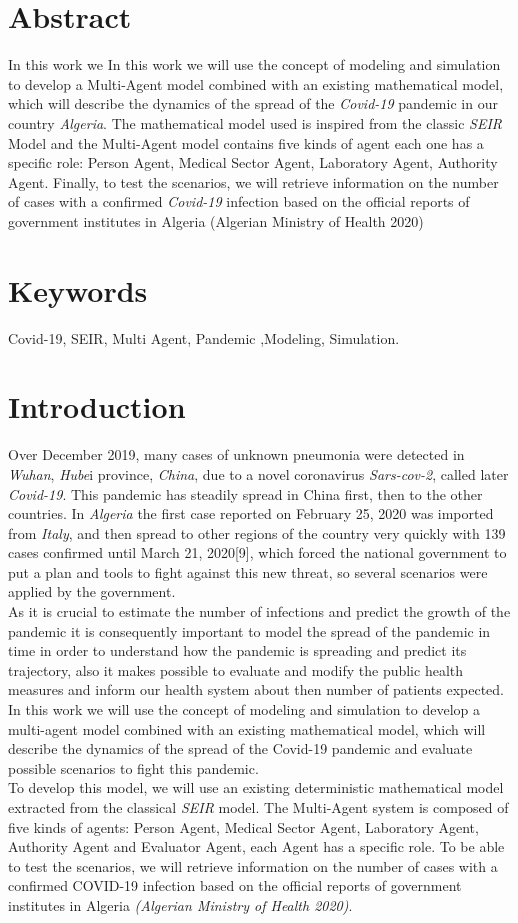 \documentclass[paper=a4, fontsize=11.5pt]{scrartcl}
\numberwithin{equation}{section}		%
\numberwithin{figure}{section}			%
\numberwithin{table}{section}				%
\begin{document}
\section{ Abstract}
\quad In this work we In this work we will use the concept of modeling and simulation to develop a Multi-Agent model combined with an existing mathematical model, which will describe the dynamics of the spread of the \emph{Covid-19} pandemic in our country \emph{Algeria}. The mathematical model used is inspired from the classic \emph{SEIR} Model and the Multi-Agent model contains five kinds of agent each one has a specific role: Person Agent, Medical Sector Agent, Laboratory Agent, Authority Agent. Finally, to test the scenarios, we will retrieve information on the number of cases with a confirmed \emph{Covid-19} infection based on the official reports of government institutes in Algeria (Algerian Ministry of Health 2020)
\section{Keywords}
\textmd {Covid-19, SEIR, Multi Agent, Pandemic ,Modeling, Simulation.}
\section{Introduction}
\quad Over December 2019, many cases of unknown pneumonia were detected in \emph{Wuhan},\emph{ Hube}i province, \emph{China}, due to a novel coronavirus \emph{Sars-cov-2}, called later \emph{Covid-19}. This pandemic has steadily spread in China  first, then to the other countries. In \emph{Algeria} the first case reported on February 25, 2020 was imported from \emph{Italy}, and then spread to other regions of the country very quickly with 139 cases confirmed until March 21, 2020[9], which forced the national government to put a plan and tools to fight against this new threat, so several scenarios were applied by the government.\\
\smallskip
\qquad As it is crucial to estimate the number of infections and predict the growth of the pandemic it is consequently important to model the spread of the pandemic in time in order to understand how the pandemic is spreading and predict its trajectory, also it makes possible to evaluate and modify the public health measures and inform our health system about then number of patients expected.\\
\smallskip
\qquad In this work we will use the concept of modeling and simulation to develop a multi-agent model combined with an existing mathematical model, which will describe the dynamics of the spread of the Covid-19 pandemic and evaluate possible scenarios to fight this pandemic.\\
To develop this model, we will use an existing deterministic mathematical model extracted from the classical \emph{ SEIR} model. The Multi-Agent system is composed of five kinds of agents: Person Agent, Medical Sector Agent, Laboratory Agent, Authority Agent and Evaluator Agent, each Agent has a specific role. To be able to test the scenarios, we will retrieve information on the number of cases with a confirmed COVID-19 infection based on the official reports of government institutes in Algeria \emph{ (Algerian Ministry of Health 2020)}.
\end{document}
